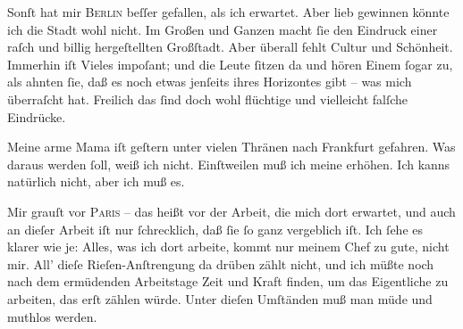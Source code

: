 \pstart
           Sonſt hat mir \textsc{Berlin} beſſer gefallen, als ich erwartet. Aber lieb {\pb}gewinnen könnte ich die Stadt
               wohl nicht. Im Großen und Ganzen macht ſie den Eindruck\strikeout{\textcolor{gray}{,}} einer raſch und billig hergeſtellten Großſtadt. Aber überall fehlt Cultur und
               Schönheit. Immerhin iſt Vieles impoſant; und die Leute ſitzen da und hören Einem  ſogar zu, als ahnten ſie, daß es noch etwas
               jenſeits ihres Horizontes gibt – was mich überraſcht hat. Freilich das ſind {\pb}doch wohl flüchtige und vielleicht falſche
               Eindrücke.\pend
           
\pstart
           Meine arme Mama iſt geſtern unter vielen Thränen nach Frankfurt gefahren. Was daraus werden ſoll, weiß ich nicht.
               Einſtweilen muß ich meine \label{K_L02784-12v}\label{K_L02784-12} erhöhen. Ich kanns natürlich nicht, aber ich muß es.\pend
           
\pstart
           Mir grauſt vor \textsc{Paris} – das heißt vor der Arbeit, die  mich {\pb}dort erwartet, und auch an dieſer Arbeit iſt nur
               ſchrecklich, daß ſie ſo ganz vergeblich iſt. Ich ſehe es \strikeout{\textcolor{gray}{×}\-\textcolor{gray}{×}} klarer wie je: Alles, was ich dort arbeite, kommt nur meinem Chef zu gute, nicht mir. All’ dieſe
               Rieſen-Anſtrengung da drüben zählt nicht, und ich müßte  noch nach dem ermüdenden Arbeitstage Zeit und Kraft finden, um das
               Eigentliche zu arbeiten, das erſt zählen würde. Unter {\pb}dieſen Umſtänden muß man müde und muthlos
               werden.\pend
           
